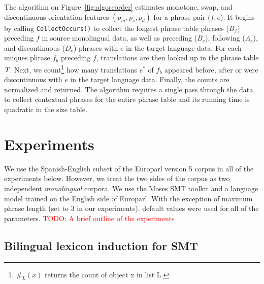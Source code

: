 \documentclass[11pt]{article}
\newcommand{\mnote}[1]{\marginpar{%
  \vskip-\baselineskip
  \raggedright\footnotesize
  \itshape\hrule\smallskip\tiny{#1}\par\smallskip\hrule}}
\newcommand{\mtodo}[1]{\mnote{\textcolor{red}{#1}}}
\newcommand{\todo}[1]{\textcolor{red}{TODO: #1}}
\newcommand{\figref}[1]{Figure~\ref{#1}}
\begin{document}
The algorithm on \figref{fig:algoreorder} estimates monotone, swap, and discontinuous orientation features $(p_m, p_s, p_d)$ for a phrase pair ($f, e$).  It begins by calling {\tt \small CollectOccurs()} to collect the longest phrase table phrases ($B_f$) preceding $f$ in source monolingual data, as well as preceding ($B_e$), following ($A_e$), and discontinuous ($D_e$) phrases with $e$ in the target language data.  For each uniques phrase $f_{b}$ preceding $f$, translations are then looked up in the phrase table $\emph{T}$.  Next, we count\footnote{$\#_{L}(x)$ returns the count of object x in list L.} how many translations $e^*$ of $f_b$ appeared before, after or were discontinuous with $e$ in the target language data.  Finally, the counts are normalized and returned. \mtodo{Be more specific about the out-of-order counts?}  The algorithm requires a single pass through the data to collect contextual phrases for the entire phrase table and its running time is quadratic in the size table.\mtodo{Check}


\section{Experiments} \label{sect:exp}

We use the Spanish-English\mtodo{Add German if done in time.} subset of the Europarl version 5 corpus \cite{Koehn:2005} in all of the experiments below.  However, we treat the two sides of the corpus as two independent {\em monolingual} corpora.  We use the Moses SMT toolkit\mtodo{Add a moses citation} and a language model trained on the English side of Europarl.  With the exception of maximum phrase length (set to 3 in our experiments\mtodo{Add our curve?}), default values were used for all of the parameters.
\todo{A brief outline of the experiments}

\subsection{Bilingual lexicon induction for SMT}
\end{document}
